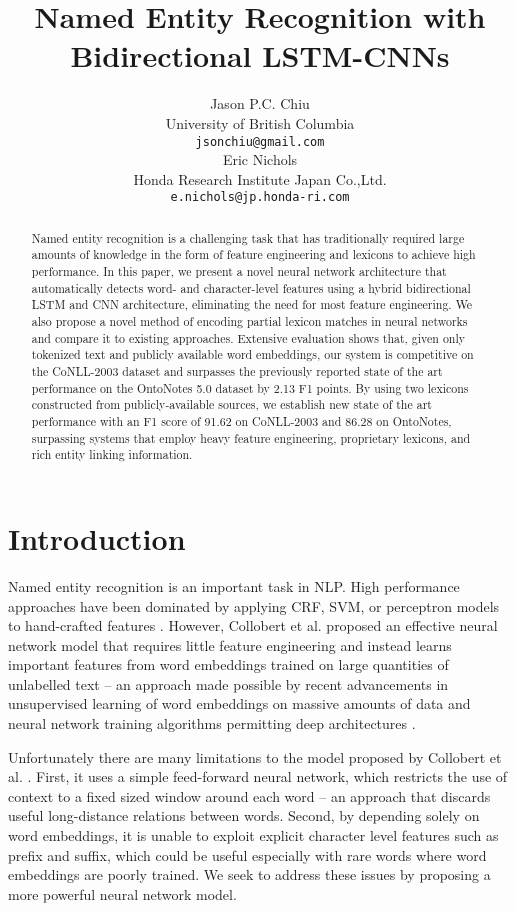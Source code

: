 \documentclass[11pt,letterpaper]{article}
\title{Named Entity Recognition with Bidirectional LSTM-CNNs}
\author{
  Jason P.C. Chiu \\
  University of British Columbia \\
  {\tt jsonchiu@gmail.com} \\ \And
  Eric Nichols \\
  Honda Research Institute Japan Co.,Ltd. \\
  {\tt e.nichols@jp.honda-ri.com} \\
}
\date{}
\begin{document}
\maketitle
\begin{abstract}





Named entity recognition is a challenging task that has traditionally required large amounts of knowledge in the form of feature engineering and lexicons to achieve high performance. In this paper, we present a novel neural network architecture that automatically detects word- and character-level features using a hybrid bidirectional LSTM and CNN architecture, eliminating the need for most feature engineering. We also propose a novel method of encoding partial lexicon matches in neural networks and compare it to existing approaches.
Extensive evaluation shows that, given only tokenized text and publicly available word embeddings, our system is competitive on the CoNLL-2003 dataset and surpasses the previously reported state of the art performance on the OntoNotes 5.0 dataset by 2.13 F1 points. By using two lexicons constructed from publicly-available sources, we establish new state of the art performance with an F1 score of 91.62 on CoNLL-2003 and 86.28 on OntoNotes, surpassing systems that employ heavy feature engineering, proprietary lexicons, and rich entity linking information.

\end{abstract}

\section{Introduction}

Named entity recognition is an important task in NLP. High performance approaches have been dominated by applying CRF, SVM, or perceptron models to hand-crafted features \cite{ratinov2009,passos2014,luo2015}. However, Collobert et al.  proposed an effective neural network model that requires little feature engineering and instead learns important features from word embeddings trained on large quantities of unlabelled text -- an approach made possible by recent advancements in unsupervised learning of word embeddings on massive amounts of data \cite{collobert2008,mikolov2013} and neural network training algorithms permitting deep architectures \cite{rumelhart1986}. 

Unfortunately there are many limitations to the model proposed by Collobert et al. . First, it uses a simple feed-forward neural network, which restricts the use of context to a fixed sized window around each word \--- an approach that discards useful long-distance relations between words. Second, by depending solely on word embeddings, it is unable to exploit explicit character level features such as prefix and suffix, which could be useful especially with rare words where word embeddings are poorly trained. We seek to address these issues by proposing a more powerful neural network model.
\end{document}
